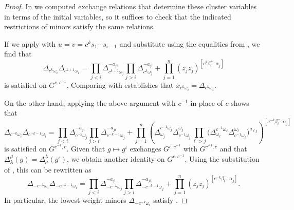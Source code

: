 \documentclass[12pt]{amsart}
\newcommand{\ol}[1]{\overline{#1}}
\theoremstyle{remark}
\numberwithin{equation}{section}
\numberwithin{figure}{section}
\begin{document}
\begin{proof}
  In  we computed exchange relations that determine these cluster variables in terms of the initial variables, so it suffices to check that the indicated restrictions of minors satisfy the same relations.

  If we apply  with $u = v = c^k s_1 \cdots s_{i-1}$ and substitute using the equalities from , we find that 
  \begin{equation}
    \Delta_{c^k\omega_i}\Delta_{c^{k+1}\omega_i} 
    = 
    \prod_{j<i}\Delta_{c^{k+1}\omega_j}^{-a_{ji}}
    \prod_{j>i}\Delta_{c^k\omega_j}^{-a_{ji}}
    +
    \prod_{j=1}^n(z_j z_{\ol{\jmath}})^{[c^k\beta_i^+:\alpha_j]}
  \end{equation}
  is satisfied on $G^{c,c^{-1}}$.
  Comparing with  establishes that $x_{c^k\omega_i} = \Delta_{c^k \omega_i}$.
  
  On the other hand, applying the above argument with $c^{-1}$ in place of $c$ shows that  
  \begin{equation*} \Delta_{c^{-k}\omega_i} \Delta_{c^{-k-1}\omega_i} = 
    \prod_{j<i}\Delta_{c^{-k}\omega_j}^{-a_{ji}}
    \prod_{j>i}\Delta_{c^{-k-1}\omega_j}^{-a_{ji}}
    +
    \prod_{j=1}^n\left( 
      \Delta^{c^{-1} \omega_j}_{\omega_j}
      \Delta^{\omega_j}_{ c^{-1}\omega_j} 
      \prod_{\ell>j}\big(
        \Delta^{c^{-1} \omega_\ell}_{\omega_\ell} 
        \Delta^{\omega_\ell}_{c^{-1} \omega_\ell}
      \big)^{a_{\ell j}}
    \right)^{[c^{-k}\beta_i^-:\alpha_j]}
  \end{equation*}
  is satisfied on $G^{c^{-1},c}$.
  Given that $g \mapsto g^\iota$ exchanges $G^{c,c^{-1}}$ with $G^{c^{-1},c}$ and that $\Delta_\lambda^\mu(g) = \Delta_\mu^\lambda(g^\iota)$, we obtain another identity on $G^{c,c^{-1}}$.
  Using the substitution of , this can be rewritten as
  \begin{equation}
  \Delta_{-c^{-k}\omega_i}\Delta_{-c^{-k-1}\omega_i} =
    \prod_{j<i}\Delta_{-c^{-k}\omega_j}^{-a_{ji}}
    \prod_{j>i}\Delta_{-c^{-k-1}\omega_j}^{-a_{ji}}
    +
    \prod_{j=1}^n (z_j z_{\ol{\jmath}})^{[c^{-k}\beta_i^-:\alpha_j]}.
  \end{equation}
  In particular, the lowest-weight minors $\Delta_{-c^{-k}\omega_i}$ satisfy .
  

\end{proof}
\end{document}
